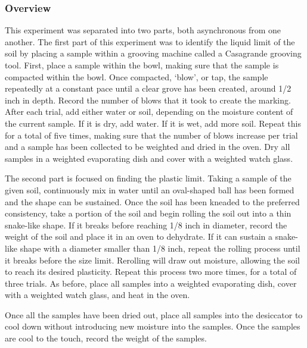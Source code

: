 \documentclass{article}
\begin{document}
\subsubsection{Overview}
\par This experiment was separated into two parts, both asynchronous from one another. The first part of this experiment was to identify the liquid limit of the soil by placing a sample within a grooving machine called a Casagrande grooving tool. First, place a sample within the bowl, making sure that the sample is compacted within the bowl. Once compacted, `blow', or tap, the sample repeatedly at a constant pace until a clear grove has been created, around 1/2 inch in depth. Record the number of blows that it took to create the marking. After each trial, add either water or soil, depending on the moisture content of the current sample. If it is dry, add water. If it is wet, add more soil. Repeat this for a total of five times, making sure that the number of blows increase per trial and a sample has been collected to be weighted and dried in the oven. Dry all samples in a weighted evaporating dish and cover with a weighted watch glass. 
\par The second part is focused on finding the plastic limit. Taking a sample of the given soil, continuously mix in water until an oval-shaped ball has been formed and the shape can be sustained. Once the soil has been kneaded to the preferred consistency, take a portion of the soil and begin rolling the soil out into a thin snake-like shape. If it breaks before reaching 1/8 inch in diameter, record the weight of the soil and place it in an oven to dehydrate. If it can sustain a snake-like shape with a diameter smaller than 1/8 inch, repeat the rolling process until it breaks before the size limit. Rerolling will draw out moisture, allowing the soil to reach its desired plasticity. Repeat this process two more times, for a total of three trials. As before, place all samples into a weighted evaporating dish, cover with a weighted watch glass, and heat in the oven.  
\par Once all the samples have been dried out, place all samples into the desiccator to cool down without introducing new moisture into the samples. Once the samples are cool to the touch, record the weight of the samples.  
\newpage
\end{document}
